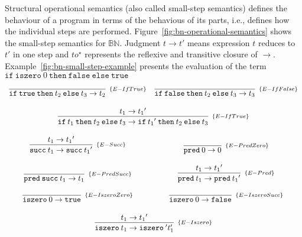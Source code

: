 Structural operational semantics\cite{plotkin1981-operational-semantics} (also 
called small-step semantics) defines the behaviour of a program in terms of the 
behavious of its parts, i.e., defines how the individual steps are performed.
Figure~\ref{fig:bn-operational-semantics} shows the small-step semantics for 
\(\mathbb{B}\mathbb{N}\). Judgment \(t \to t'\) means expression \(t\) reduces
to \(t'\) in one step and \(to^\star\) represents the reflexive and transitive
closure of \(\to\). Example~\ref{fig:bn-small-step-example} presents the 
evaluation of the term \(\texttt{if}\:\texttt{iszero}\:0\:\texttt{then}\:
\texttt{false}\:\texttt{else}\:\texttt{true}\)

\begin{figure*}[!h]
    \[
        \begin{array}{cc}
            \infer[_{\{E-IfTrue\}}]{\texttt{if}\:\texttt{true}\:\texttt{then}\:t_2\:\texttt{else}\:t_3 \to t_2}{}
            &
            \infer[_{\{E-IfFalse\}}]{\texttt{if}\:\texttt{false}\:\texttt{then}\:t_2\:\texttt{else}\:t_3 \to t_3}{}
            \\ \\
            \multicolumn{2}{c}{
                \infer[_{\{E-IfTrue\}}]{
                    \texttt{if}\:t_1\:\texttt{then}\:t_2\:\texttt{else}\:t_3
                    \to
                    \texttt{if}\:{t_1}'\:\texttt{then}\:t_2\:\texttt{else}\:t_3
                }{
                    t_1 \to {t_1}'
                }
            }
            \\ \\
            \infer[_{\{E-Succ\}}]{\texttt{succ}\:t_1 \to \texttt{succ}\:{t_1}'}{t_1 \to {t_1}'}
            &
            \infer[_{\{E-PredZero\}}]{\texttt{pred}\:0 \to 0}{}
            \\ \\
            \infer[_{\{E-PredSucc\}}]{\texttt{pred}\:\texttt{succ}\:t_1 \to t_1}{}
            &
            \infer[_{\{E-Pred\}}]{\texttt{pred}\:t_1 \to \texttt{pred}\:{t_1}'}{t_1 \to {t_1}'}
            \\ \\
            \infer[_{\{E-IszeroZero\}}]{\texttt{iszero}\:0 \to \texttt{true}}{}
            &
            \infer[_{\{E-IszeroSucc\}}]{\texttt{iszero}\:0 \to \texttt{false}}{}
            \\ \\
            \multicolumn{2}{c}{
                \infer[_{\{E-Iszero\}}]{\texttt{iszero}\:t_1 \to \texttt{iszero}\:{'t_1'}}{{t_1 \to {t_1}'}}
            }
        \end{array}
    \]
    \centering
    \caption{Structural operational semantics for \(\mathbb{B}\mathbb{N}\)}
    \label{fig:bn-operational-semantics}
\end{figure*}

